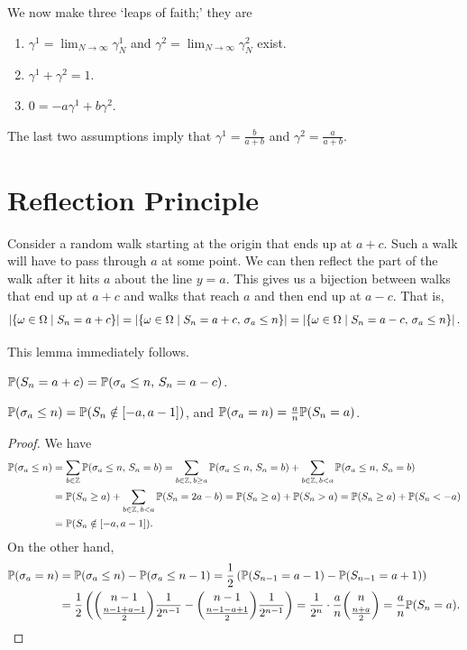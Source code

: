 We now make three `leaps of faith;' they are
\begin{enumerate}
    \item $\gamma^{1} = \lim_{N \to \infty} \gamma_{N}^{1}$ and $\gamma^{2} = \lim_{N \to \infty} \gamma_{N}^{2}$ exist.
    \item $\gamma^{1} + \gamma^{2} = 1$.
    \item $0 = -a\gamma^{1} + b\gamma^{2}$.
\end{enumerate}
The last two assumptions imply that $\gamma^{1} = \frac{b}{a+b}$ and $\gamma^{2} = \frac{a}{a+b}$.

\section{Reflection Principle}

Consider a random walk starting at the origin that ends up at $a+c$. Such a walk will have to pass through $a$ at some point. We can then reflect the part of the walk after it hits $a$ about the line $y=a$. This gives us a bijection between walks that end up at $a+c$ and walks that reach $a$ and then end up at $a-c$. That is,
\begin{align}
    \left| \{\omega \in \Omega \mid S_{n} = a+c\} \right| = \left| \{\omega \in \Omega \mid S_{n} = a+c,\, \sigma_{a} \leq n\} \right| = \left| \{\omega \in \Omega \mid S_{n} = a-c,\, \sigma_{a} \leq n\} \right|.
\end{align}

This lemma immediately follows.
\begin{lemma}
    $\mathbb{P}(S_{n}=a+c) = \mathbb{P}(\sigma_{a} \leq n,\, S_{n}=a-c)$.
\end{lemma}

\begin{theorem}
    $\mathbb{P}(\sigma_{a} \leq n) = \mathbb{P}(S_{n} \notin [-a,a-1])$, and $\mathbb{P}(\sigma_{a}=n) = \frac{a}{n}\mathbb{P}(S_{n}=a)$.
\end{theorem}
\begin{proof}
    We have
    \begin{align}
        \mathbb{P}(\sigma_{a} \leq n) &= \sum_{b \in \mathbb{Z}} \mathbb{P}(\sigma_{a} \leq n,\, S_{n} = b) = \sum_{b \in \mathbb{Z},\, b \geq a} \mathbb{P}(\sigma_{a} \leq n,\, S_{n} = b) + \sum_{b \in \mathbb{Z},\, b < a} \mathbb{P}(\sigma_{a} \leq n,\, S_{n} = b) \notag \\
        &= \mathbb{P}(S_{n} \geq a) + \sum_{b \in \mathbb{Z},\, b < a} \mathbb{P}(S_{n}=2a-b) = \mathbb{P}(S_{n} \geq a) + \mathbb{P}(S_{n} > a) = \mathbb{P}(S_{n} \geq a) + \mathbb{P}(S_{n} < -a) \notag \\
        &= \mathbb{P}(S_{n} \notin [-a,a-1]).
    \end{align}
    On the other hand,
    \begin{align}
        \mathbb{P}(\sigma_{a}=n) &= \mathbb{P}(\sigma_{a} \leq n) - \mathbb{P}(\sigma_{a} \leq n-1) = \frac{1}{2} \left( \mathbb{P}(S_{n-1} = a-1) - \mathbb{P}(S_{n-1}=a+1)\right) \notag \\
        &= \frac{1}{2} \left( \binom{n-1}{\frac{n-1+a-1}{2}}\frac{1}{2^{n-1}} - \binom{n-1}{\frac{n-1-a+1}{2}}\frac{1}{2^{n-1}} \right) = \frac{1}{2^{n}} \cdot \frac{a}{n} \binom{n}{\frac{n+a}{2}} = \frac{a}{n}\mathbb{P}(S_{n}=a).
    \end{align}
\end{proof}

